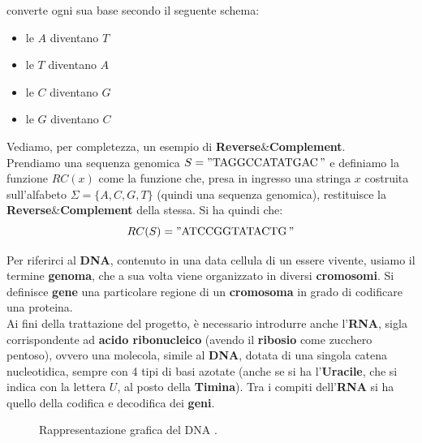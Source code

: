 \documentclass[a4paper,12pt, oneside]{book}
\begin{document}
converte ogni sua base secondo il seguente schema:
\begin{itemize}
  \item le $A$ diventano $T$
  \item le $T$ diventano $A$
  \item le $C$ diventano $G$
  \item le $G$ diventano $C$
\end{itemize}
\begin{esempio}
  Vediamo, per completezza, un esempio di
  \textbf{Reverse}\textnormal{\&}\textbf{Complement}.\\ 
  Prendiamo una sequenza genomica $S="\mbox{TAGGCCATATGAC}\,"$ e definiamo la funzione
  $RC(x)$ come la funzione che, presa in ingresso una stringa $x$ costruita
  sull'alfabeto $\Sigma=\{A,C,G,T\}$ (quindi una sequenza genomica), restituisce
  la \textbf{Reverse}\textnormal{\&}\textbf{Complement} della stessa. Si ha
  quindi che: 
  \[RC(S)="\mbox{ATCCGGTATACTG}\,"\]
\end{esempio}
Per riferirci al \textbf{DNA}, contenuto in una data cellula di un essere
vivente, usiamo il termine \textbf{genoma}, che a sua volta viene organizzato in
diversi \textbf{cromosomi}. Si definisce \textbf{gene} una particolare regione
di un \textbf{cromosoma} in grado di codificare una proteina. \\
Ai fini della trattazione del progetto, è necessario introdurre anche
l'\textbf{RNA}, sigla corrispondente ad \textbf{acido ribonucleico} (avendo il
\textbf{ribosio} come zucchero pentoso), ovvero una
molecola, simile al \textbf{DNA}, dotata di una singola 
catena nucleotidica, sempre con 4 tipi di basi azotate (anche se si ha
l'\textbf{Uracile}, che si indica con la lettera $U$, al posto della
\textbf{Timina}). Tra i compiti dell'\textbf{RNA} si ha quello della codifica e
decodifica dei \textbf{geni}.
\begin{figure}[H]
  \centering
  
  \caption{Rappresentazione grafica del DNA \cite{dna}.}
  \label{dnaa}
\end{figure}
\end{document}
